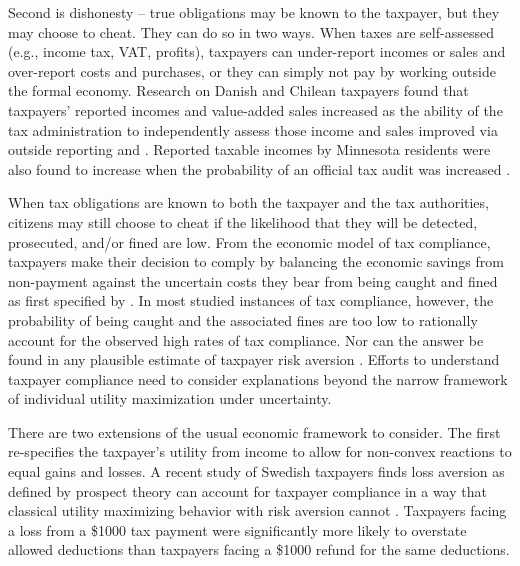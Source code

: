 \documentclass[12pt]{article}
\begin{document}
Second is dishonesty -- true obligations may be known to the taxpayer,
but they may choose to cheat.  They can do so in two ways.  When taxes
are self-assessed (e.g., income tax, VAT, profits), taxpayers can
under-report incomes or sales and over-report costs and purchases, or
they can simply not pay by working outside the formal economy.
Research on Danish and Chilean taxpayers found that taxpayers'
reported incomes and value-added sales increased as the ability of the
tax administration to independently assess those income and sales
improved via outside reporting  and
.  Reported taxable incomes by Minnesota residents
were also found to increase when the probability of an official tax
audit was increased \cite{Slemrod-01}.

When tax obligations are known to both the taxpayer and the tax
authorities, citizens may still choose to cheat if the likelihood that
they will be detected, prosecuted, and/or fined are low.  From the
economic model of tax compliance, taxpayers make their decision to
comply by balancing the economic savings from non-payment against the
uncertain costs they bear from being caught and fined as first
specified by .  In most studied instances
of tax compliance, however, the probability of being caught and the
associated fines are too low to rationally account for the observed
high rates of tax compliance.  Nor can the answer be found in any
plausible estimate of taxpayer risk aversion \cite{Alm-92}. Efforts to
understand taxpayer compliance need to consider explanations beyond
the narrow framework of individual utility maximization under
uncertainty.

There are two extensions of the usual economic framework to consider.
The first re-specifies the taxpayer's utility from income to allow for
non-convex reactions to equal gains and losses.  A recent study of
Swedish taxpayers finds loss aversion as defined by prospect theory
can account for taxpayer compliance in a way that classical utility
maximizing behavior with risk aversion cannot \cite{Engstrom-15}.
Taxpayers facing a loss from a \$1000 tax payment were significantly
more likely to overstate allowed deductions than taxpayers facing a
\$1000 refund for the same deductions.
\end{document}
